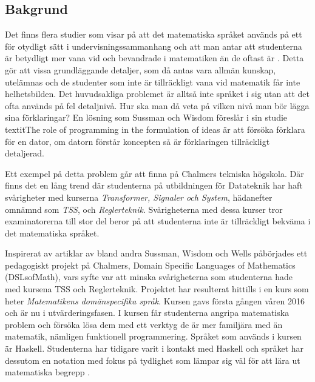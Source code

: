 \documentclass[12pt,a4paper,twoside,openright]{article}
\begin{document}
\subsection{Bakgrund}
%

Det finns flera studier som visar på att det matematiska språket används på ett för
otydligt sätt i undervisningssammanhang och att man antar att studenterna
är betydligt mer vana vid och bevandrade i matematiken än de oftast är
\cite{sussman2002role} \cite{wells1995communicating}.
Detta gör att vissa grundläggande detaljer, som då antas vara allmän kunskap,
utelämnas och de studenter som inte är tillräckligt vana vid matematik får inte
helhetsbilden.
Det huvudsakliga problemet är alltså inte språket i sig utan att det ofta
används på fel detaljnivå. Hur ska man då veta på vilken nivå man bör lägga
sina förklaringar? En lösning som Sussman och Wisdom föreslår i sin studie textit{The 
role of programming in the formulation of ideas}\cite{sussman2002role} är att
försöka förklara för en dator, om datorn förstår koncepten så är förklaringen
tillräckligt detaljerad.

Ett exempel på detta problem går att finna på Chalmers tekniska högskola.
Där finns det en lång trend där studenterna på utbildningen för Datateknik har
haft svårigheter med kurserna \textit{Transformer, Signaler och System}, hädanefter
omnämnd som \textit{TSS}, och \textit{Reglerteknik}.
Svårigheterna med dessa kurser tror examinatorerna till stor del beror på att
studenterna inte är tillräckligt bekväma i det matematiska språket.

Inspirerat av artiklar av bland andra Sussman, Wisdom och Wells påbörjades ett
pedagogiskt projekt på Chalmers, Domain Specific Languages of Mathematics (\gls{DSLsofMath}), vars syfte var att minska
svårigheterna som studenterna hade med kursena TSS och Reglerteknik.
Projektet har resulterat hittills i en kurs som heter
\textit{Matematikens domänspecifika språk}. Kursen gavs första gången våren 2016 och är nu
i utvärderingsfasen. I kursen får studenterna angripa
matematiska problem och försöka lösa dem med ett verktyg de är
mer familjära med än matematik, nämligen funktionell programmering. Språket 
som används i kursen är Haskell. Studenterna har tidigare
varit i kontakt med Haskell och språket har dessutom en notation med fokus på
tydlighet som lämpar sig väl för att lära ut matematiska begrepp
\cite{TFPIE15_DSLsofMath_IonescuJansson}.
\end{document}

